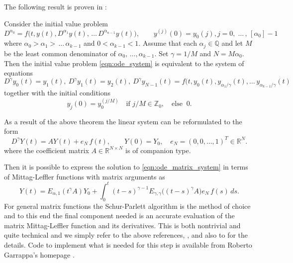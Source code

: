 The following result is proven in \cite{Popolizio:2018}:
\begin{theorem}
Consider the initial value problem
\begin{equation}\label{eqn:ode_ivp}
D^{\alpha_0} = f\bigl(t,y(t),D^{\alpha_1}y(t),\,\ldots\,
D^{\alpha_{n-1}}y(t)\bigr),\qquad
y^{(j)}(0) = y_0{(j)}, j = 0,\;\ldots\,,\,[\alpha_0]-1
\end{equation}
where $\alpha_0> \alpha_1 >\, \ldots\, \alpha_{k-1}$ and $0<\alpha_{k-1}<1$.
Assume that each $\alpha_j\in \mathbb{Q}$ and let $M$ 
be the least
common denominator of $\alpha_0,\,\ldots,\alpha_{k-1}$.
Set $\gamma=1/M$ and $N=M\alpha_0$.
Then the initial value problem \eqref{eqn:ode_system} is equivalent to
the system of equations
\begin{equation}\label{eqn:ode_system}
D^\gamma y_0(t) = y_1(t),\ D^\gamma y_1(t) = y_2(t), \ 
	D^\gamma y_{N-1}(t) = f(t,y_0(t),y_{\alpha_1/\gamma}(t),\ldots
	\,y_{\alpha_{k-1}/\gamma}(t)
\end{equation}
together with the initial conditions
\begin{equation}\label{eqn:ode_system_init_conditions}
	y_j(0) = y_0^{(j/M)} \quad \mbox{if } j/M \in \mathbb{Z}_0,
	\quad \mbox{else }\ 0.
\end{equation}
\end{theorem}
As a result of the above theorem the linear system can be reformulated to
the form
\begin{equation}\label{eqn:ode_matrix_system}
D^\gamma Y(t) = A Y(t) + 
e_N\,f(t),\qquad Y(0)=Y_0,
\quad e_N = (0,0,\ldots,1)^T\in \mathbb{R}^N.
\end{equation}
where the coefficient matrix $A\in \mathbb{R}^{N\times N}$ is of 
companion type.

Then it is possible to express the solution to \eqref{eqn:ode_matrix_system}
in terms of Mittag-Leffler functions with matrix arguments as
\begin{equation}\label{eqn:ode_matrix_ML}
Y(t) = E_{\alpha,1}(t^\gamma A) Y_0 
+ \int_0^t (t-s)^{\gamma-1} E_{\gamma,\gamma}\bigl((t-s)^\gamma A\bigr)
	e_N\,f(s)\,ds.
\end{equation}
For general matrix functions the Schur-Parlett algorithm is the method of
choice and to this end the final component needed is an accurate evaluation
of the matrix Mittag-Leffler function and its derivatives.
This is both nontrivial and quite technical and we simply refer to the above
references, \cite{GarrappaPopolizio:2018,Popolizio:2018},
and also to \cite{Garrappa:2015} for the details.
Code to implement what is needed for this step is available from
Roberto Garrappa's homepage \cite{Garrappa}.

